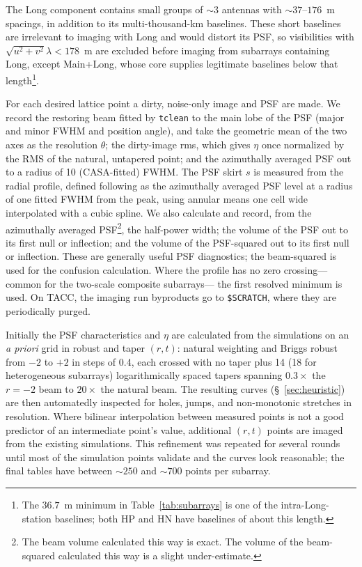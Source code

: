 \documentclass[11pt]{article}
\begin{document}
The Long component contains small groups of $\sim 3$ antennas with
$\sim 37$--$176$~m spacings, in addition to its multi-thousand-km
baselines.  These short baselines are irrelevant to imaging with Long
and would distort its PSF, so visibilities with $\sqrt{u^2 + v^2}
\lambda < 178$~m are excluded before imaging from subarrays containing
Long, except Main+Long, whose core supplies legitimate baselines below
that length\footnote{The $36.7$~m minimum in Table~\ref{tab:subarrays}
is one of the intra-Long-station baselines; both HP and HN have
baselines of about this length.}.

For each desired lattice point a dirty, noise-only image and PSF are
made.  We record the restoring beam fitted by {\tt tclean} to the main
lobe of the PSF (major and minor FWHM and position angle), and take
the geometric mean of the two axes as the resolution $\theta$; the
dirty-image rms, which gives $\eta$ once normalized by the RMS of the
natural, untapered point; and the azimuthally averaged PSF out to a
radius of 10 (CASA-fitted) FWHM. The PSF skirt $s$ is measured from
the radial profile, defined following \citep{memo65} as the
azimuthally averaged PSF level at a radius of one fitted FWHM from the
peak, using annular means one cell wide interpolated with a cubic
spline. We also calculate and record, from the azimuthally averaged
PSF\footnote{The beam volume calculated this way is exact. The volume
of the beam-squared calculated this way is a slight under-estimate.},
the half-power width; the volume of the PSF out to its first null or
inflection; and the volume of the PSF-squared out to its first null or
inflection. These are generally useful PSF diagnostics; the
beam-squared is used for the confusion calculation. Where the profile
has no zero crossing--- common for the two-scale composite
subarrays--- the first resolved minimum is used.  On TACC, the imaging
run byproducts go to {\tt \$SCRATCH}, where they are periodically
purged.

Initially the PSF characteristics and $\eta$ are calculated from the
simulations on an {\it a priori} grid in robust and taper $(r,t)$:
natural weighting and Briggs robust from $-2$ to $+2$ in steps of 0.4,
each crossed with no taper plus 14 (18 for heterogeneous subarrays)
logarithmically spaced tapers spanning $0.3\times$ the $r=-2$ beam to
$20\times$ the natural beam.  The resulting curves
(\S~\ref{sec:heuristic}) are then automatedly inspected for holes,
jumps, and non-monotonic stretches in resolution. Where bilinear
interpolation between measured points is not a good predictor of an
intermediate point's value, additional $(r,t)$ points are imaged from
the existing simulations.  This refinement was repeated for several
rounds until most of the simulation points validate and the curves
look reasonable; the final tables have between $\sim 250$ and
$\sim 700$ points per subarray.
\end{document}
